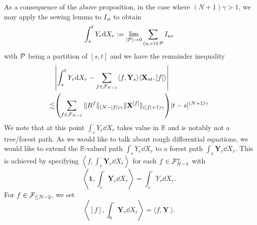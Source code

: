 \documentclass[11pt]{style/preprint}
\begin{document}
As a consequence of the above proposition, in the case where \((N + 1) \gamma > 1\), we may apply the sewing 
lemma to \(I_{st}\) to obtain 
\[\int_s^t Y_r \dd X_r := \lim_{|{\mathcal P}| \to 0} \sum_{(u, v) \in {\mathcal P}} I_{uv}\]
with \({\mathcal P}\) being a partition of \([s, t]\) and we have the remainder inequality 
\begin{align*}
  & \left|\int_s^t Y_r \dd X_r - \sum_{f \in \CF_{N - 1}} \langle f, \mathbf{Y}_s\rangle \langle \mathbf{X}_{st}, [f]\rangle\right|\\
  \lesssim & \left(\sum_{f \in \CF_{N - 1}} \|R^f\|_{(N - |f|)\gamma} \|\mathbf{X}^{[f]}\|_{(|f| + 1)\gamma}\right)|t - s|^{(N + 1)\gamma}
\end{align*}
We note that at this point \(\int_s^{\cdot} Y_r \dd X_r\) takes value in \(\mathbb{R}\) and is notably not a tree/forest 
path. As we would like to talk about rough differential equations, we would like to extend the \(\mathbb{R}\)-valued 
path \(\int_s^{\cdot} Y_r \dd X_r\) to a forest path \(\int_s^{\cdot} \mathbf{Y}_r \dd X_r\). This is achieved by 
specifying \(\left\langle f, \int_s^{\cdot} \mathbf{Y}_r \dd X_r \right\rangle\) for each \(f \in {\mathcal F}_{N - 1}^*\) 
with 
\[\left\langle \mathbf{1}, \int_s^{\cdot} \mathbf{Y}_r \dd X_r \right\rangle = \int_s^{\cdot} Y_r \dd X_r.\]
For \(f \in {\mathcal F}_{\le N - 2}\), we set 
\[\left\langle [f], \int_0^{\cdot} \mathbf{Y}_r \dd X_r \right\rangle = \langle f, \mathbf{Y}_{\cdot}\rangle.\]
\end{document}
